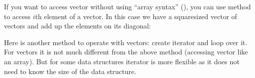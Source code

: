 \documentclass[letterpaper,10pt,english,openany,oneside]{sphinxmanual}
\begin{document}
\sphinxAtStartPar
If you want to access vector without using “array syntax” (),
you can use method  to access \(i\)\sphinxhyphen{}th element of a vector.
In this case we have a square\sphinxhyphen{}sized
vector of vectors and add up the elements on its diagonal:

\begin{sphinxVerbatim}[commandchars=\\\{\}]
   
     
           
      
   
\end{sphinxVerbatim}

\sphinxAtStartPar
Here is another method to operate with vectors: create iterator and loop over it.
For vectors it is not much different from the above method (accessing vector like an array).
But for some data structures iterator is more flexible as it does not need to know the size
of the data structure.

\begin{sphinxVerbatim}[commandchars=\\\{\}]
   
     
           
      
   
\end{sphinxVerbatim}
\end{document}
